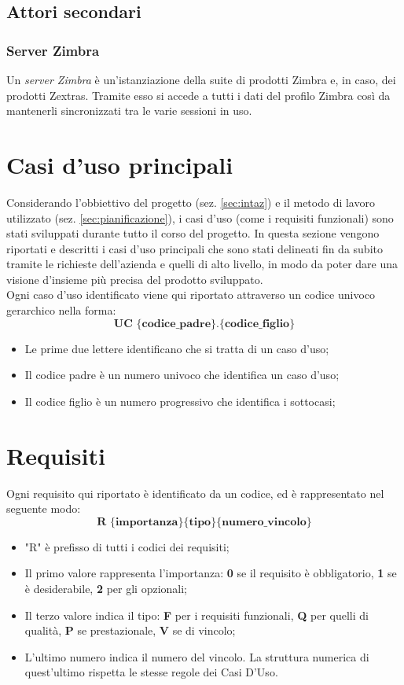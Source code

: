 \subsection{Attori secondari}
\subsubsection{Server Zimbra}
Un \emph{server Zimbra} è un'istanziazione della suite di prodotti Zimbra e, in
caso, dei prodotti Zextras. Tramite esso si accede a tutti i dati del profilo
Zimbra così da mantenerli sincronizzati tra le varie sessioni in uso.

\section{Casi d'uso principali}
Considerando l'obbiettivo del progetto (sez. \ref{sec:intaz}) e il metodo di 
lavoro utilizzato (sez. \ref{sec:pianificazione}), i casi d'uso (come i
requisiti funzionali) sono stati sviluppati durante tutto il corso del progetto.
In questa sezione vengono riportati e descritti i casi d'uso principali che 
sono stati delineati fin da subito tramite le richieste dell'azienda e quelli 
di alto livello, in modo da poter dare una visione d’insieme più precisa del 
prodotto sviluppato. \\

Ogni caso d'uso identificato viene qui riportato attraverso un codice univoco 
gerarchico nella forma:
$$ \textbf{UC \{codice\_padre\}.\{codice\_figlio\}  } $$
\begin{itemize}
	\item Le prime due lettere identificano che si tratta di un caso d'uso;
	\item Il codice padre è un numero univoco che identifica un caso d'uso;
	\item Il codice figlio è un numero progressivo che identifica i sottocasi;\\
\end{itemize}



\section{Requisiti}
Ogni requisito qui riportato è identificato da un codice, ed è rappresentato nel seguente modo:
$$ \textbf{R \{importanza\}\{tipo\}\{numero\_vincolo\} } $$

\begin{itemize}
	\item "R" è prefisso di tutti i codici dei requisiti;
	\item Il primo valore rappresenta l'importanza: \textbf{0} se il requisito è obbligatorio, \textbf{1} se è desiderabile, \textbf{2} per gli opzionali;
	\item Il terzo valore indica il tipo: \textbf{F} per i requisiti funzionali, \textbf{Q} per quelli di qualità, \textbf{P} se prestazionale, \textbf{V} se di vincolo;
	\item L'ultimo numero indica il numero del vincolo. La struttura numerica di quest'ultimo rispetta le stesse regole dei Casi D'Uso.
\end{itemize}


